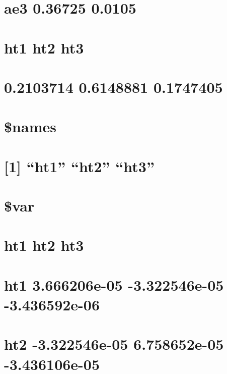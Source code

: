 \documentclass[]{book}
\theoremstyle{definition}
\theoremstyle{definition}
\theoremstyle{definition}
\theoremstyle{remark}
\begin{document}
\section{ae3 0.36725 0.0105}\label{ae3-0.36725-0.0105}

\section{ht1 ht2 ht3}\label{ht1-ht2-ht3}

\section{0.2103714 0.6148881 0.1747405}\label{section-73}

\section{\$names}\label{names}

\section{\texorpdfstring{{[}1{]} ``ht1'' ``ht2''
``ht3''}{{[}1{]} ht1 ht2 ht3}}\label{ht1-ht2-ht3-1}

\section{}\label{section-74}

\section{\$var}\label{var}

\section{ht1 ht2 ht3}\label{ht1-ht2-ht3-2}

\section{ht1 3.666206e-05 -3.322546e-05
-3.436592e-06}\label{ht1-3.666206e-05--3.322546e-05--3.436592e-06}

\section{ht2 -3.322546e-05 6.758652e-05
-3.436106e-05}\label{ht2--3.322546e-05-6.758652e-05--3.436106e-05}
\end{document}
